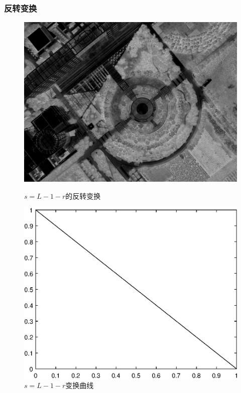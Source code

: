 \subsubsection{反转变换}
\begin{figure}[H]
	\centering
	\begin{minipage}{0.45\linewidth}
		\includegraphics[width=\linewidth]{figure/DJI_0027_Reversed.png}
		\caption{$s=L-1-r$的反转变换}
	\end{minipage}
	\begin{minipage}{0.45\linewidth}
		\includegraphics[width=\linewidth]{figure/DJI_0027_Reversed_Graph.eps}
		\caption{$s=L-1-r$变换曲线}
	\end{minipage}
\end{figure}
